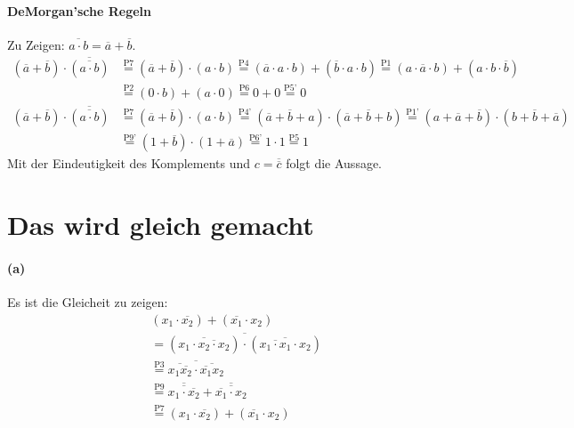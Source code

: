 \documentclass[a4paper]{article}
\begin{document}
\paragraph{DeMorgan'sche Regeln}
Zu Zeigen: $\overline{a\cdot b} = \overline{a} + \overline{b}$.
\begin{align*}
	(\overline{a}+\overline{b})\cdot\overline{(\overline{a\cdot b})} &\stackrel{\text{P7}}{=} (\overline{a}+\overline{b})\cdot(a\cdot b) \stackrel{\text{P4}}{=} (\overline{a}\cdot a\cdot b) + (\overline{b}\cdot a\cdot b) \stackrel{\text{P1}}{=} (a\cdot\overline{a}\cdot b) + (a\cdot b\cdot\overline{b})\\
																	 &\stackrel{\text{P2}}{=} (0\cdot b)+(a\cdot 0) \stackrel{\text{P6}}{=} 0+0\stackrel{\text{P5'}}{=} 0
\end{align*}
\begin{align*}
	(\overline{a}+\overline{b})\cdot\overline{(\overline{a\cdot b})} &\stackrel{\text{P7}}{=} (\overline{a}+\overline{b})\cdot(a\cdot b) \stackrel{\text{P4'}}{=} (\overline{a}+\overline{b}+a)\cdot(\overline{a}+\overline{b}+b) \stackrel{\text{P1'}}{=} (a+\overline{a}+\overline{b})\cdot(b+\overline{b}+\overline{a})\\
																	 &\stackrel{\text{P9'}}{=} (1+\overline{b})\cdot(1+\overline{a}) \stackrel{\text{P6'}}{=} 1\cdot 1 \stackrel{\text{P5}}{=} 1
\end{align*}
Mit der Eindeutigkeit des Komplements und $c = \overline{\overline{c}}$ folgt die Aussage.

\section{Das wird gleich gemacht}
\paragraph{(a)}
Es ist die Gleicheit zu zeigen:
\begin{align*}
	&(x_1\cdot \overline{x_2}) + (\overline{x_1}\cdot x_2) \\
	&= \overline{(\overline{x_1\cdot\overline{x_2\cdot x_2}})\cdot (\overline{\overline{x_1\cdot x_1}\cdot x_2})} \\
	&\stackrel{\text{P3}}{=} \overline{\overline{x_1\overline{x_2}}\cdot\overline{\overline{x_1}x_2}}\\
	&\stackrel{\text{P9}}{=} \overline{\overline{x_1\cdot\overline{x_2}}} + \overline{\overline{\overline{x_1}\cdot x_2}}\\
	&\stackrel{\text{P7}}{=} (x_1\cdot\overline{x_2})+(\overline{x_1}\cdot x_2)
\end{align*}
\end{document}
